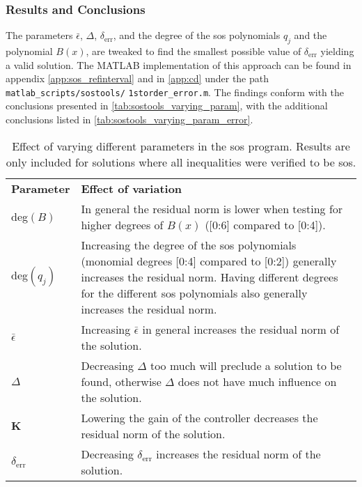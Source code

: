 \subsubsection{Results and Conclusions}

\vspace{-2mm}
The parameters $\bar{\epsilon}$, $\Delta$, $\delta_\text{err}$, and the degree of the \gls{sos} polynomials $q_j$ and the polynomial $B(x)$, are tweaked to find the smallest possible value of $\delta_\text{err}$ yielding a valid solution.
The MATLAB implementation of this approach can be found in appendix \ref{app:sos_refinterval} and in \autoref{app:cd} under the path \texttt{matlab\_scripts/}\texttt{sostools/} \texttt{1storder\_error.m}.
The findings conform with the conclusions presented in \autoref{tab:sostools_varying_param}, with the additional conclusions listed in \autoref{tab:sostools_varying_param_error}.

 





\begin{table}[htbp]
\begin{tabularx}{\textwidth}{l X}
\rowcolor{HeaderBlue}
\textbf{Parameter} & \textbf{Effect of variation}\\
deg$(B)$ & In general the residual norm is lower when testing for higher degrees of $B(x)$ ([0:6] compared to [0:4]).\\
\rowcolor{textBlue}
deg$(q_j)$ & Increasing the degree of the \gls{sos} polynomials (monomial degrees [0:4] compared to [0:2]) generally increases the residual norm. Having different degrees for the different \gls{sos} polynomials also generally increases the residual norm.\\
$\bar{\epsilon}$ & Increasing $\bar{\epsilon}$ in general increases the residual norm of the solution. \\
\rowcolor{textBlue}
$\Delta$ & Decreasing $\Delta$ too much will preclude a solution to be found, otherwise $\Delta$ does not have much influence on the solution.\\
\textbf{K} & Lowering the gain of the controller decreases the residual norm of the solution.\\
\rowcolor{textBlue}
$\delta_\text{err}$ & Decreasing $\delta_\text{err}$ increases the residual norm of the solution. %
\end{tabularx}
\caption{Effect of varying different parameters in the \gls{sos} program. Results are only included for solutions where all inequalities were verified to be \gls{sos}.}
\label{tab:sostools_varying_param_error}
\end{table}

